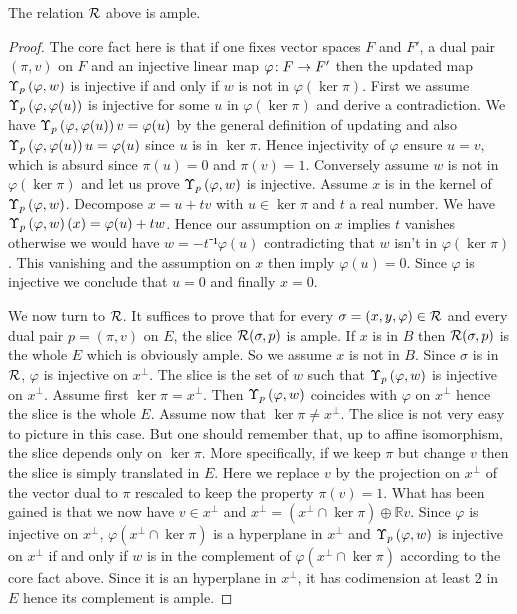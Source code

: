 \begin{lemma}
  \label{lem:loc_immersion_rel_ample}
  \leanok
  The relation $\mathcal{R}$ above is ample.
\end{lemma}

\begin{proof}
  \leanok
  The core fact here is that if one fixes vector spaces $F$ and $F'$, a dual
  pair $(\pi, v)$ on $F$ and an injective linear map $\varphi \!: F \to F'$
  then the updated map $\Upsilon_{p}\left(\varphi, w\right)$ is injective if and only if $w$
  is not in $\varphi(\ker\pi)$. First we assume $\Upsilon_{p}\left(\varphi, \varphi(u)\right)$
  is injective for some $u$ in $\varphi(\ker\pi)$ and derive a contradiction.
  We have $\Upsilon_{p}\left(\varphi, \varphi(u)\right)v = \varphi(u)$ by the general
  definition of updating and also $\Upsilon_{p}\left(\varphi, \varphi(u)\right)u = \varphi(u)$
  since $u$ is in $\ker \pi$. Hence injectivity of $\varphi$ ensure $u = v$,
  which is absurd since $\pi(u) = 0$ and $\pi(v) = 1$. Conversely assume $w$
  is not in $\varphi(\ker\pi)$ and let us prove $\Upsilon_{p}\left(\varphi, w\right)$ is
  injective. Assume $x$ is in the kernel of $\Upsilon_{p}\left(\varphi, w\right)$. Decompose
  $x = u + tv$ with $u \in \ker\pi$ and $t$ a real number. We have
  $\Upsilon_{p}\left(\varphi, w\right)(x) = \varphi(u) + tw$. Hence our assumption on $x$
  implies $t$ vanishes otherwise we would have $w = -t⁻¹\varphi(u)$
  contradicting that $w$ isn't in $\varphi(\ker\pi)$. This vanishing and the
  assumption on $x$ then imply $\varphi(u) = 0$. Since $\varphi$ is injective
  we conclude that $u = 0$ and finally $x = 0$.

  We now turn to $\mathcal{R}$. It suffices to prove that for every $\sigma = (x, y,
  \varphi) \in \mathcal{R}$ and every dual pair $p = (\pi, v)$ on $E$, the slice
  $\mathcal{R}(\sigma, p)$ is ample. If $x$ is in $B$ then $\mathcal{R}(\sigma, p)$ is the
  whole $E$ which is obviously ample. So we assume $x$ is not in $B$. Since
  $\sigma$ is in $\mathcal{R}$, $\varphi$ is injective on $x^\perp$. The slice is the
  set of $w$ such that $\Upsilon_{p}\left(\varphi, w\right)$ is injective on $x^\perp$. Assume
  first $\ker\pi = x^\perp$. Then $\Upsilon_{p}\left(\varphi, w\right)$ coincides with
  $\varphi$ on $x^\perp$ hence the slice is the whole $E$. Assume now that
  $\ker\pi \neq x^\perp$. The slice is not very easy to picture in this case.
  But one should remember that, up to affine isomorphism, the slice depends
  only on $\ker \pi$. More specifically, if we keep $\pi$ but change $v$ then
  the slice is simply translated in $E$. Here we replace $v$ by the projection
  on $x^\perp$ of the vector dual to $\pi$ rescaled to keep the property
  $\pi(v) = 1$. What has been gained is that we now have $v \in x^\perp$ and
  $x^\perp = (x^\perp \cap \ker \pi) \oplus ℝ v$. Since $\varphi$ is
  injective on $x^\perp$, $\varphi(x^\perp \cap \ker \pi)$ is a hyperplane
  in $x^\perp$ and $\Upsilon_{p}\left(\varphi, w\right)$ is injective on $x^\perp$ if and only
  if $w$ is in the complement of $\varphi(x^\perp \cap \ker \pi)$ according to
  the core fact above. Since it is an hyperplane in $x^\perp$, it has
  codimension at least $2$ in $E$ hence its complement is ample.
\end{proof}

